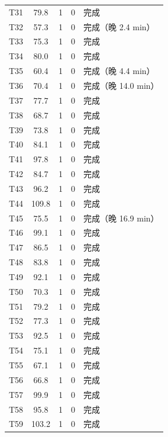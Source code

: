 \documentclass[a4paper,11pt]{article}
\begin{document}
\begin{table}[htbp]
\begin{tabular}{rcccl}
T31 & 79.8 & 1 & 0 & 完成 \\
T32 & 57.3 & 1 & 0 & 完成（晚 2.4 min） \\
T33 & 75.3 & 1 & 0 & 完成 \\
T34 & 80.0 & 1 & 0 & 完成 \\
T35 & 60.4 & 1 & 0 & 完成（晚 4.4 min） \\
T36 & 70.4 & 1 & 0 & 完成（晚 14.0 min） \\
T37 & 77.7 & 1 & 0 & 完成 \\
T38 & 68.7 & 1 & 0 & 完成 \\
T39 & 73.8 & 1 & 0 & 完成 \\
T40 & 84.1 & 1 & 0 & 完成 \\
T41 & 97.8 & 1 & 0 & 完成 \\
T42 & 84.7 & 1 & 0 & 完成 \\
T43 & 96.2 & 1 & 0 & 完成 \\
T44 & 109.8 & 1 & 0 & 完成 \\
T45 & 75.5 & 1 & 0 & 完成（晚 16.9 min） \\
T46 & 99.1 & 1 & 0 & 完成 \\
T47 & 86.5 & 1 & 0 & 完成 \\
T48 & 83.8 & 1 & 0 & 完成 \\
T49 & 92.1 & 1 & 0 & 完成 \\
T50 & 70.3 & 1 & 0 & 完成 \\
T51 & 79.2 & 1 & 0 & 完成 \\
T52 & 77.3 & 1 & 0 & 完成 \\
T53 & 92.5 & 1 & 0 & 完成 \\
T54 & 75.1 & 1 & 0 & 完成 \\
T55 & 67.1 & 1 & 0 & 完成 \\
T56 & 66.8 & 1 & 0 & 完成 \\
T57 & 99.9 & 1 & 0 & 完成 \\
T58 & 95.8 & 1 & 0 & 完成 \\
T59 & 103.2 & 1 & 0 & 完成 \\
\bottomrule
\end{tabular}
\end{table}
\end{document}
